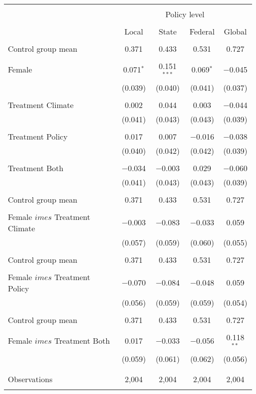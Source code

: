 
\begin{tabular}{@{\extracolsep{5pt}}lcccc} 
\\[-1.8ex]\hline 
\hline \\[-1.8ex] 
 & \multicolumn{4}{c}{Policy level} \\ 
\cline{2-5} 
\\[-1.8ex] & Local & State & Federal & Global \\ 
\hline \\[-1.8ex] 
 Control group mean & 0.371 & 0.433 & 0.531 & 0.727  \\ \hline \\[-1.8ex] Female & 0.071$^{*}$ & 0.151$^{***}$ & 0.069$^{*}$ & $-$0.045 \\ 
  & (0.039) & (0.040) & (0.041) & (0.037) \\ 
  & & & & \\ 
 Treatment Climate & 0.002 & 0.044 & 0.003 & $-$0.044 \\ 
  & (0.041) & (0.043) & (0.043) & (0.039) \\ 
  & & & & \\ 
 Treatment Policy & 0.017 & 0.007 & $-$0.016 & $-$0.038 \\ 
  & (0.040) & (0.042) & (0.042) & (0.039) \\ 
  & & & & \\ 
 Treatment Both & $-$0.034 & $-$0.003 & 0.029 & $-$0.060 \\ 
  & (0.041) & (0.043) & (0.043) & (0.039) \\ 
  & & & & \\ 
 Control group mean & 0.371 & 0.433 & 0.531 & 0.727  \\ \hline \\[-1.8ex] Female $	imes$ Treatment Climate & $-$0.003 & $-$0.083 & $-$0.033 & 0.059 \\ 
  & (0.057) & (0.059) & (0.060) & (0.055) \\ 
  & & & & \\ 
 Control group mean & 0.371 & 0.433 & 0.531 & 0.727  \\ \hline \\[-1.8ex] Female $	imes$ Treatment Policy & $-$0.070 & $-$0.084 & $-$0.048 & 0.059 \\ 
  & (0.056) & (0.059) & (0.059) & (0.054) \\ 
  & & & & \\ 
 Control group mean & 0.371 & 0.433 & 0.531 & 0.727  \\ \hline \\[-1.8ex] Female $	imes$ Treatment Both & 0.017 & $-$0.033 & $-$0.056 & 0.118$^{**}$ \\ 
  & (0.059) & (0.061) & (0.062) & (0.056) \\ 
  & & & & \\ 
\hline \\[-1.8ex] 

Observations & 2,004 & 2,004 & 2,004 & 2,004 \\ 
\hline 
\hline \\[-1.8ex] 
\end{tabular} 